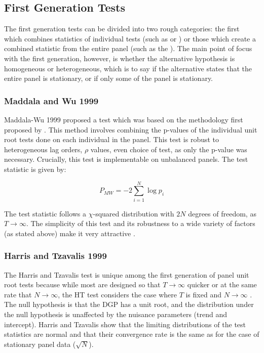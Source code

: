 \subsection{First Generation Tests}
The first generation tests can be divided into two rough categories: the first which combines statistics of individual tests (such as \citet{mw} or  \citet{ips}) or those which create a combined statistic from the entire panel (such as the \citet{llc}). The main point of focus with the first generation, however, is whether the alternative hypothesis is homogeneous or heterogeneous, which is to say if the alternative states that the entire panel is stationary, or if only some of the panel is stationary.

\subsubsection{Maddala and Wu 1999}

Maddala-Wu 1999 proposed a test which was based on the methodology first proposed by \citet{fisher}. This method involves combining the p-values of the individual unit root tests done on each individual in the panel. This test is robust to heterogeneous lag orders, $\rho$ values, even choice of test, as only the p-value was necessary. Crucially, this test is implementable on unbalanced panels. The test statistic is given by:

\begin{equation}
P_{MW} = -2 \sum_{i=1}^{N} \log p_i
\end{equation}

The test statistic follows a $\chi$-squared distribution with $2N$ degrees of freedom, as $T \to \infty$. The simplicity of this test and its robustness to a wide variety of factors (as stated above) make it very attractive \citep{banerjee1999panel}.

\subsubsection{Harris and Tzavalis 1999}

The Harris and Tzavalis test is unique among the first generation of panel unit root tests because while most are designed so that $T \to \infty$ quicker or at the same rate that $N \to \infty$, the HT test considers the case where $T$ is fixed and $N \to \infty$ \citep{harris1999inference}. The null hypothesis is that the DGP has a unit root, and the distribution under the null hypothesis is unaffected by the nuisance parameters (trend and intercept). Harris and Tzavalis show that the limiting distributions of the test statistics are normal and that their convergence rate is the same as for the case of stationary panel data ($\sqrt{N}$).

